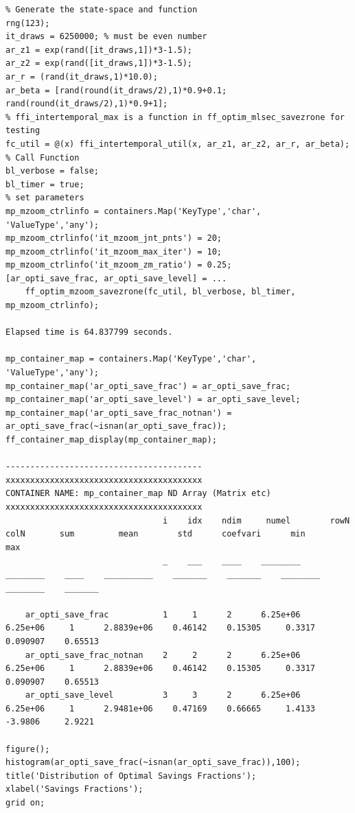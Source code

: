 \documentclass[
]{book}
\begin{document}
\begin{verbatim}
% Generate the state-space and function
rng(123);
it_draws = 6250000; % must be even number
ar_z1 = exp(rand([it_draws,1])*3-1.5);
ar_z2 = exp(rand([it_draws,1])*3-1.5);
ar_r = (rand(it_draws,1)*10.0);
ar_beta = [rand(round(it_draws/2),1)*0.9+0.1; rand(round(it_draws/2),1)*0.9+1]; 
% ffi_intertemporal_max is a function in ff_optim_mlsec_savezrone for testing
fc_util = @(x) ffi_intertemporal_util(x, ar_z1, ar_z2, ar_r, ar_beta);
% Call Function
bl_verbose = false;
bl_timer = true;
% set parameters
mp_mzoom_ctrlinfo = containers.Map('KeyType','char', 'ValueType','any');
mp_mzoom_ctrlinfo('it_mzoom_jnt_pnts') = 20;
mp_mzoom_ctrlinfo('it_mzoom_max_iter') = 10;
mp_mzoom_ctrlinfo('it_mzoom_zm_ratio') = 0.25;
[ar_opti_save_frac, ar_opti_save_level] = ...
    ff_optim_mzoom_savezrone(fc_util, bl_verbose, bl_timer, mp_mzoom_ctrlinfo);

Elapsed time is 64.837799 seconds.

mp_container_map = containers.Map('KeyType','char', 'ValueType','any');
mp_container_map('ar_opti_save_frac') = ar_opti_save_frac;
mp_container_map('ar_opti_save_level') = ar_opti_save_level;
mp_container_map('ar_opti_save_frac_notnan') = ar_opti_save_frac(~isnan(ar_opti_save_frac));
ff_container_map_display(mp_container_map);

----------------------------------------
xxxxxxxxxxxxxxxxxxxxxxxxxxxxxxxxxxxxxxxx
CONTAINER NAME: mp_container_map ND Array (Matrix etc)
xxxxxxxxxxxxxxxxxxxxxxxxxxxxxxxxxxxxxxxx
                                i    idx    ndim     numel        rowN      colN       sum         mean        std      coefvari      min         max  
                                _    ___    ____    ________    ________    ____    __________    _______    _______    ________    ________    _______

    ar_opti_save_frac           1     1      2      6.25e+06    6.25e+06     1      2.8839e+06    0.46142    0.15305     0.3317     0.090907    0.65513
    ar_opti_save_frac_notnan    2     2      2      6.25e+06    6.25e+06     1      2.8839e+06    0.46142    0.15305     0.3317     0.090907    0.65513
    ar_opti_save_level          3     3      2      6.25e+06    6.25e+06     1      2.9481e+06    0.47169    0.66665     1.4133      -3.9806     2.9221

figure();
histogram(ar_opti_save_frac(~isnan(ar_opti_save_frac)),100);
title('Distribution of Optimal Savings Fractions');
xlabel('Savings Fractions');
grid on;
\end{verbatim}
\end{document}
